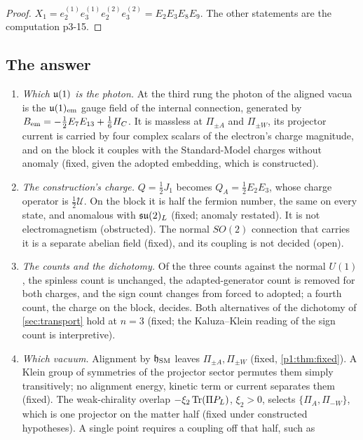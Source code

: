 \begin{proof}
$X_1=e^{(1)}_2e^{(1)}_3e^{(2)}_2e^{(2)}_3=E_2E_3E_8E_9$. The other statements are the computation p3-15.
\end{proof}

\subsection{The answer}
\label{p3:sec:answer}

\begin{enumerate}[label=(\alph*),leftmargin=2.2em]
\item \emph{Which $\mathfrak{u}(1)$ is the photon.} At the third rung the photon of the aligned vacua is the $\mathfrak{u}(1)_{\rm em}$ gauge field of the internal connection, generated by
$B_{\rm em}=-\tfrac12E_7E_{13}+\tfrac16H_C$. It is massless at $\Pi_{\pm A}$ and $\Pi_{\pm W}$, its projector current is carried by four complex scalars of the electron's
charge magnitude, and on the block it couples with the Standard-Model charges without anomaly (fixed, given the adopted embedding, which is constructed).
\item \emph{The construction's charge.} $Q=\tfrac12J_1$ becomes $Q_A=\tfrac12E_2E_3$, whose charge operator is $\tfrac12\mathcal U$. On the block it is half the fermion number, the
same on every state, and anomalous with $\mathfrak{su}(2)_L$ (fixed; anomaly restated). It is not electromagnetism (obstructed). The normal $SO(2)$ connection that carries it is a
separate abelian field (fixed), and its coupling is not decided (open).
\item \emph{The counts and the dichotomy.} Of the three counts against the normal $U(1)$, the spinless count is unchanged, the adapted-generator count is removed for both
charges, and the sign count changes from forced to adopted; a fourth count, the charge on the block, decides. Both alternatives of the dichotomy of
\cref{sec:transport} hold at $n=3$ (fixed; the Kaluza--Klein reading of the sign count is interpretive).
\item \emph{Which vacuum.} Alignment by $\mathfrak h_{\rm SM}$ leaves $\Pi_{\pm A},\Pi_{\pm W}$ (fixed, \cref{p1:thm:fixed}). A Klein group of symmetries of the projector sector
permutes them simply transitively; no alignment energy, kinetic term or current separates them (fixed). The weak-chirality overlap $-\xi_2\operatorname{Tr}(\Pi P_L)$, $\xi_2>0$, selects
$\{\Pi_A,\Pi_{-W}\}$, which is one projector on the matter half (fixed under constructed hypotheses). A single point requires a coupling off that half, such as

\end{enumerate}
